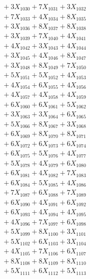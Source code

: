 \documentclass[a4paper,10pt]{article}
\begin{document}
{\begin{align}
&\;  + 3 X_{1030} + 7 X_{1031} + 3 X_{1032} \\[0.3ex]
&\;  + 7 X_{1033} + 4 X_{1034} + 8 X_{1035} \\[0.3ex]
&\;  + 3 X_{1036} + 8 X_{1037} + 8 X_{1038} \\[0.3ex]
&\;  + 3 X_{1039} + 7 X_{1040} + 4 X_{1041} \\[0.3ex]
&\;  + 4 X_{1042} + 3 X_{1043} + 4 X_{1044} \\[0.3ex]
&\;  + 3 X_{1045} + 4 X_{1046} + 8 X_{1047} \\[0.3ex]
&\;  + 3 X_{1048} + 8 X_{1049} + 7 X_{1050} \\[0.3ex]
&\;  + 5 X_{1051} + 5 X_{1052} + 4 X_{1053} \\[0.3ex]
&\;  + 4 X_{1054} + 6 X_{1055} + 4 X_{1056} \\[0.3ex]
&\;  + 4 X_{1057} + 4 X_{1058} + 4 X_{1059} \\[0.5ex]\allowbreak
&\;  + 6 X_{1060} + 6 X_{1061} + 5 X_{1062} \\[0.3ex]
&\;  + 3 X_{1063} + 3 X_{1064} + 6 X_{1065} \\[0.3ex]
&\;  + 5 X_{1066} + 8 X_{1067} + 3 X_{1068} \\[0.3ex]
&\;  + 6 X_{1069} + 8 X_{1070} + 8 X_{1071} \\[0.3ex]
&\;  + 6 X_{1072} + 6 X_{1073} + 6 X_{1074} \\[0.3ex]
&\;  + 6 X_{1075} + 5 X_{1076} + 4 X_{1077} \\[0.3ex]
&\;  + 5 X_{1078} + 4 X_{1079} + 6 X_{1080} \\[0.3ex]
&\;  + 6 X_{1081} + 4 X_{1082} + 7 X_{1083} \\[0.3ex]
&\;  + 6 X_{1084} + 5 X_{1085} + 4 X_{1086} \\[0.3ex]
&\;  + 7 X_{1087} + 6 X_{1088} + 7 X_{1089} \\[0.5ex]\allowbreak
&\;  + 6 X_{1090} + 4 X_{1091} + 6 X_{1092} \\[0.3ex]
&\;  + 6 X_{1093} + 4 X_{1094} + 4 X_{1095} \\[0.3ex]
&\;  + 4 X_{1096} + 7 X_{1097} + 6 X_{1098} \\[0.3ex]
&\;  + 5 X_{1099} + 8 X_{1100} + 3 X_{1101} \\[0.3ex]
&\;  + 5 X_{1102} + 6 X_{1103} + 3 X_{1104} \\[0.3ex]
&\;  + 4 X_{1105} + 7 X_{1106} + 6 X_{1107} \\[0.3ex]
&\;  + 8 X_{1108} + 8 X_{1109} + 8 X_{1110} \\[0.3ex]
&\;  + 5 X_{1111} + 6 X_{1112} + 5 X_{1113} \\[0.3ex]

\end{align}}
\end{document}
